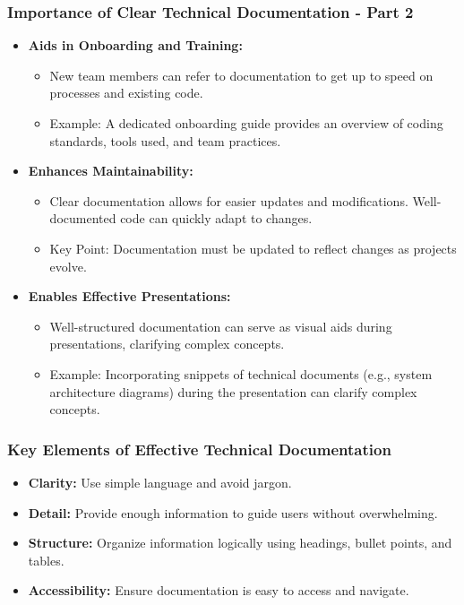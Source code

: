 \documentclass{beamer}
\begin{document}
\begin{frame}[fragile]
    \frametitle{Importance of Clear Technical Documentation - Part 2}
    \begin{itemize}
        \item \textbf{Aids in Onboarding and Training:}
        \begin{itemize}
            \item New team members can refer to documentation to get up to speed on processes and existing code.
            \item Example: A dedicated onboarding guide provides an overview of coding standards, tools used, and team practices.
        \end{itemize}
        
        \item \textbf{Enhances Maintainability:}
        \begin{itemize}
            \item Clear documentation allows for easier updates and modifications. Well-documented code can quickly adapt to changes.
            \item Key Point: Documentation must be updated to reflect changes as projects evolve.
        \end{itemize}
        
        \item \textbf{Enables Effective Presentations:}
        \begin{itemize}
            \item Well-structured documentation can serve as visual aids during presentations, clarifying complex concepts.
            \item Example: Incorporating snippets of technical documents (e.g., system architecture diagrams) during the presentation can clarify complex concepts.
        \end{itemize}
    \end{itemize}
\end{frame}

\begin{frame}[fragile]
    \frametitle{Key Elements of Effective Technical Documentation}
    \begin{itemize}
        \item \textbf{Clarity:} Use simple language and avoid jargon.
        \item \textbf{Detail:} Provide enough information to guide users without overwhelming.
        \item \textbf{Structure:} Organize information logically using headings, bullet points, and tables.
        \item \textbf{Accessibility:} Ensure documentation is easy to access and navigate.
    \end{itemize}
\end{frame}
\end{document}
